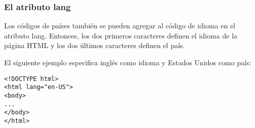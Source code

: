 \begin{frame}[fragile]
  \frametitle{El atributo lang}

  Los códigos de países también se pueden agregar al código de idioma
  en el atributo lang. Entonces, los dos primeros caracteres definen
  el idioma de la página HTML y los dos últimos caracteres definen el
  país.

  El siguiente ejemplo especifica inglés como idioma y Estados Unidos
  como país:

  \vspace{\baselineskip}
  \begin{lstlisting}
<!DOCTYPE html>
<html lang="en-US">
<body>
...
</body>
</html>
  \end{lstlisting}
\end{frame}
